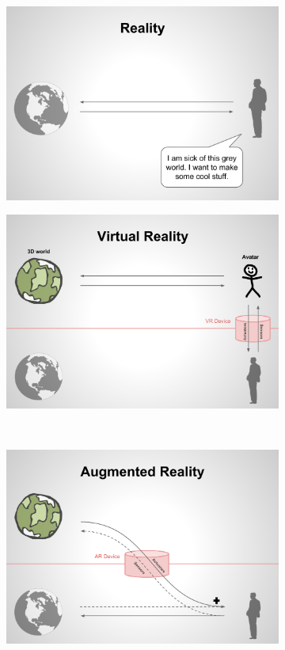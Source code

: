 \begin{figure}
\centering
\begin{subfigure}{0.49\textwidth}
\centering
\includegraphics[scale=0.13]{schemas/reality1}
\end{subfigure}
\begin{subfigure}{0.49\textwidth}
\centering
\includegraphics[scale=0.13]{schemas/virtualreality}
\end{subfigure} \\[1em]
\begin{subfigure}{0.49\textwidth}
\centering
\includegraphics[scale=0.13]{schemas/augmentedreality}

\end{subfigure}
\end{figure}
